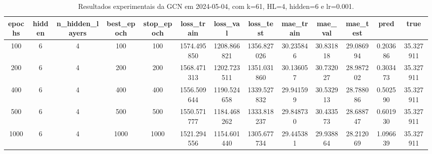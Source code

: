 \begin{table}[h]
\centering
\caption{Resultados experimentais da GCN em 2024-05-04, com k=61, HL=4, hidden=6 e lr=0.001.}
\label{tab:gcn_results_k61_hl4_h6_d20240504}
\begin{tabular}{ccccccccccccc}
\toprule
epochs & hidden & n\_hidden\_layers & best\_epoch & stop\_epoch & loss\_train & loss\_val & loss\_test & mae\_train & mae\_val & mae\_test & pred & true \\
\midrule
100 & 6 & 4 & 100 & 100 & 1574.495850 & 1208.866821 & 1356.827026 & 30.235846 & 30.831818 & 29.086994 & 0.203686 & 35.327911 \\
200 & 6 & 4 & 200 & 200 & 1568.471313 & 1202.723511 & 1351.031860 & 30.136057 & 30.732027 & 28.987202 & 0.303473 & 35.327911 \\
400 & 6 & 4 & 400 & 400 & 1556.509644 & 1190.524658 & 1339.527832 & 29.941599 & 30.532913 & 28.788086 & 0.502590 & 35.327911 \\
500 & 6 & 4 & 500 & 500 & 1550.571777 & 1184.468262 & 1333.818237 & 29.848730 & 30.433573 & 28.688747 & 0.601930 & 35.327911 \\
1000 & 6 & 4 & 1000 & 1000 & 1521.294556 & 1154.601440 & 1305.677734 & 29.445381 & 29.938864 & 28.212069 & 1.096639 & 35.327911 \\
\bottomrule
\end{tabular}
\end{table}
